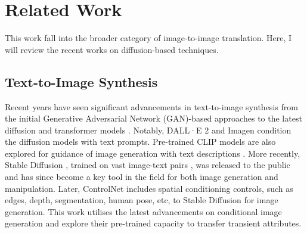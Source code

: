 \section{Related Work}\label{zero-shot-RW}
This work fall into the broader category of image-to-image translation. Here, I will review the recent works on diffusion-based techniques.

\subsection{Text-to-Image Synthesis}

Recent years have seen significant advancements in text-to-image synthesis from the initial Generative Adversarial Network (GAN)-based approaches \cite{li2020manigan,xu2018attngan, zhang2017stackgan, zhang2018stackgan++} to the latest diffusion \cite{gu2022vector, ho2020denoising,nichol2021improved,ramesh2022hierarchical, rombach2022high, saharia2022photorealistic,song2020denoising,zhang2023adding} and transformer models \cite{ding2022cogview2, esser2021taming, ramesh2021zero, yu2022scaling}. Notably, DALL·E 2 \cite{ramesh2022hierarchical} and Imagen \cite{ho2022imagen} condition the diffusion models with text prompts.  Pre-trained CLIP models \cite{radford2021learning} are also explored for guidance of image generation with text descriptions \cite{crowson2022vqgan, ramesh2022hierarchical}. More recently, Stable Diffusion \cite{rombach2022high}, trained on vast image-text pairs \cite{schuhmann2021laion}, was released to the public and has since become a key tool in the field for both image generation and manipulation. Later, ControlNet \cite{zhang2023adding} includes spatial conditioning controls, such as edges, depth, segmentation, human pose, etc, to Stable Diffusion for image generation. This work utilises the latest advancements on conditional image generation and explore their pre-trained capacity to transfer transient attributes.


